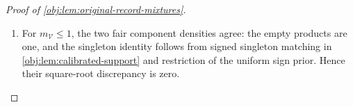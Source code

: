 \documentclass[11pt]{article}
\begin{document}
\begin{proof}[Proof of \cref{obj:lem:original-record-mixtures}]
\begin{enumerate}
Define the component affinities and conditional discrepancy by
\[
\begin{aligned}
\mathfrak a_{\mathcal V}^{\mathrm{fair}}
&=
4^{-m_{\mathcal V}}\sum_{\boldsymbol l_{\mathcal V}}
\sqrt{\mathsf L_{t,\mathcal V}^{\mathrm{fair}}
\mathsf L_{*,\mathcal V}^{\mathrm{fair}}},\\
\mathsf h_{\mathrm{fair}}(\mathbf x;\delta_{\mathrm{aux}})
&=
\int
\left(
\sqrt{\mathsf L_t^{\mathrm{fair}}}
-\sqrt{\mathsf L_*^{\mathrm{fair}}}
\right)^2\,d\tau^{\otimes n}.
\end{aligned}
\]
Expanding the squared difference and using normalization gives
\(0\le\mathfrak a_{\mathcal V}^{\mathrm{fair}}\le1\) and
\[
\begin{aligned}
\mathsf h_{\mathrm{fair}}(\mathbf x;\delta_{\mathrm{aux}})
&=2\left(1-\prod_{\mathcal V}
\mathfrak a_{\mathcal V}^{\mathrm{fair}}\right)\\
&\le
2\sum_{\mathcal V}(1-\mathfrak a_{\mathcal V}^{\mathrm{fair}})\\
&=
\sum_{\mathcal V\in\mathscr B_{\mathbf x}}
4^{-m_{\mathcal V}}\sum_{\boldsymbol l_{\mathcal V}}
\left(
\sqrt{\mathsf L_{t,\mathcal V}^{\mathrm{fair}}}
-\sqrt{\mathsf L_{*,\mathcal V}^{\mathrm{fair}}}
\right)^2.
\end{aligned}
\]
Here the affinity factors by finite distributivity, and the inequality
is the finite-product inequality for numbers in \([0,1]\).
The common covariate marginal also gives
\[
\mathcal H^2(Q_t,P_{*,t,\delta_{\mathrm{aux}}}^{\otimes n})
=
\int\mathsf h_{\mathrm{fair}}(\mathbf x;\delta_{\mathrm{aux}})
\,d\lambda^{\otimes n}(\mathbf x),
\]
where \(Q_t\) in this display is evaluated at the auxiliary amplitude.

\item For \(m_{\mathcal V}\le1\), the two fair component densities agree:
the empty products are one, and the singleton identity follows from
signed singleton matching in \cref{obj:lem:calibrated-support} and
restriction of the uniform sign prior. Hence their square-root
discrepancy is zero.


\end{enumerate}
\end{proof}
\end{document}
